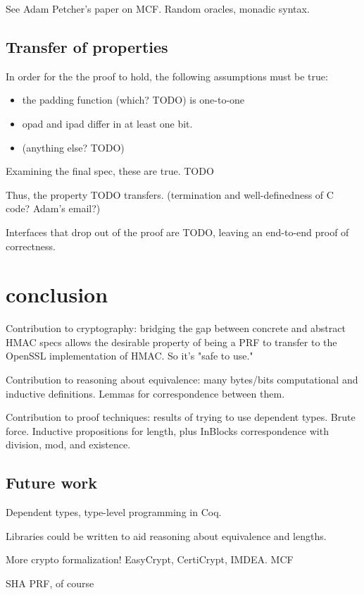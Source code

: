 \documentclass[twocolumn,showpacs,%
  nofootinbib,aps,superscriptaddress,%
  eqsecnum,prd,notitlepage,showkeys,10pt]{revtex4-1}
\begin{document}
See Adam Petcher's paper on MCF. Random oracles, monadic syntax.

\subsection{Transfer of properties}

In order for the the proof to hold, the following assumptions must be true:
\begin{itemize}
\item the padding function (which? TODO) is one-to-one
\item opad and ipad differ in at least one bit.
\item (anything else? TODO)
\end{itemize}

Examining the final spec, these are true. TODO

Thus, the property TODO transfers. (termination and well-definedness of C code? Adam's email?)

Interfaces that drop out of the proof are TODO, leaving an end-to-end proof of correctness.

\section{conclusion}

Contribution to cryptography: bridging the gap between concrete and abstract HMAC specs allows the desirable property of being a PRF to transfer to the OpenSSL implementation of HMAC. So it's "safe to use."

Contribution to reasoning about equivalence: many bytes/bits computational and inductive definitions. Lemmas for correspondence between them. 

Contribution to proof techniques: results of trying to use dependent types. Brute force. Inductive propositions for length, plus InBlocks correspondence with division, mod, and existence.

\subsection{Future work}

Dependent types, type-level programming in Coq.

Libraries could be written to aid reasoning about equivalence and lengths.

More crypto formalization! EasyCrypt, CertiCrypt, IMDEA. MCF

SHA PRF, of course
\end{document}
